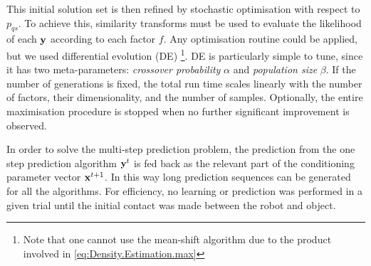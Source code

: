 This initial solution set is then refined by stochastic optimisation with respect to $p_{qs}$. To achieve this, similarity transforms must be used to evaluate the likelihood of each $\mathbf{y}$ according to each factor $f$. Any optimisation routine could be applied, but we used differential evolution (DE) \citep{storn_differential_1997}\footnote{Note that one cannot use the mean-shift algorithm \citep{cheng_mean_1995}
due to the product involved in \eqref{eq:Density.Estimation.max}}.
DE is particularly simple to tune, since it has two meta-parameters: \textit{crossover probability} $\alpha$ and \textit{population size} $\beta$. If the number of generations is fixed, the total run time scales linearly with the number of factors, their dimensionality, and the number of samples. Optionally, the entire maximisation procedure is stopped when no further significant improvement is observed. 

%
%

In order to solve the multi-step prediction problem, the prediction from the one step prediction algorithm $\mathbf{y}^t$ is fed back as the relevant part of the conditioning parameter vector $\mathbf{x}^{t+1}$. In this way long prediction sequences can be generated for all the algorithms. For efficiency, no learning or prediction was performed in a given trial until the initial contact was made between the robot and object.
